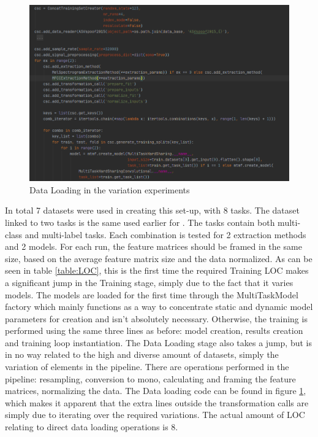 \begin{figure}
	\centering
	\includegraphics[width=\linewidth]{screenshot005}
	\caption{Data Loading in the variation experiments}
	\label{fig:screenshot005}
\end{figure}

In total 7 datasets were used in creating this set-up, with 8 tasks. The dataset linked to two tasks is the same used earlier for \citep{georgiev2017low}. The tasks contain both multi-class and multi-label tasks. Each combination is tested for 2 extraction methods and 2 models. For each run, the feature matrices should be framed in the same size, based on the average feature matrix size and the data normalized. As can be seen in table \ref{table:LOC}, this is the first time the required Training LOC makes a significant jump in the Training stage, simply due to the fact that it varies models. The models are loaded for the first time through the MultiTaskModel factory which mainly functions as a way to concentrate static and dynamic model parameters for creation and isn't absolutely necessary. Otherwise, the training is performed using the same three lines as before: model creation, results creation and training loop instantiation. The Data Loading stage also takes a jump, but is in no way related to the high and diverse amount of datasets, simply the variation of elements in the pipeline. There are  operations performed in the pipeline: resampling, conversion to mono, calculating and framing the feature matrices, normalizing the data. The Data loading code can be found in figure \ref{fig:screenshot005}, which makes it apparent that the extra lines outside the transformation calls are simply due to iterating over the required variations. The actual amount of LOC relating to direct data loading operations is 8.\\

